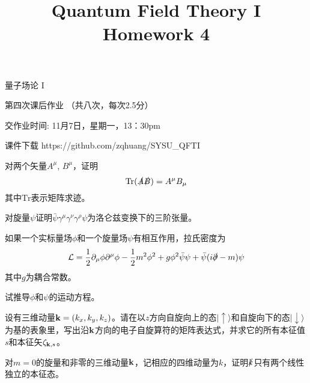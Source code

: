 \documentclass[CJK]{beamer}
\title{Quantum Field Theory I \\ Homework 4}
\author{}
\date{}
\begin{document}
\begin{frame}
 
\begin{center}
\begin{Large}
\bch
量子场论 I 

{\vskip 0.3in}

第四次课后作业 （共八次，每次2.5分）

交作业时间: 11月7日，星期一，13：30pm

\ech
\end{Large}
\end{center}

\vskip 0.2in

\bch
课件下载
\ech
https://github.com/zqhuang/SYSU\_QFTI

\end{frame}

\begin{frame}
\bch
对两个矢量$A^\mu$, $B^\mu$，证明
$$\mathrm{Tr}(\slashed{A}\slashed{B}) = A^\mu B_\mu$$
其中$\mathrm{Tr}$表示矩阵求迹。
\ech
\end{frame}

\begin{frame}
\bch
对旋量$\psi$证明$\bar{\psi}\gamma^\mu\gamma^\nu\gamma^\rho\psi$为洛仑兹变换下的三阶张量。
\ech
\end{frame}

\begin{frame}
\bch
如果一个实标量场$\phi$和一个旋量场$\psi$有相互作用，拉氏密度为
$${\mathcal{L}} = \frac{1}{2}\partial_\mu\phi\partial^\mu\phi - \frac{1}{2}m^2\phi^2 + g\phi^2\bar\psi\psi + \bar\psi(i\slashed{\partial}-m)\psi$$
其中$g$为耦合常数。

试推导$\phi$和$\psi$的运动方程。
\ech
\end{frame}


\begin{frame}
\bch
设有三维动量${\mathbf{k}} = (k_x, k_y, k_z)$。请在以$z$方向自旋向上的态$|\uparrow\rangle$和自旋向下的态$|\downarrow\rangle$为基的表象里，写出沿${\mathbf{k}}$方向的电子自旋算符的矩阵表达式，并求它的所有本征值$s$和本征矢$\zeta_{{\mathbf{k}},s}$。
\ech
\end{frame}


\begin{frame}
\bch
对$m=0$的旋量和非零的三维动量${\mathbf{k}}$，记相应的四维动量为$k$，证明$\slashed{k}$只有两个线性独立的本征态。 
\ech
\end{frame}
\end{document}
